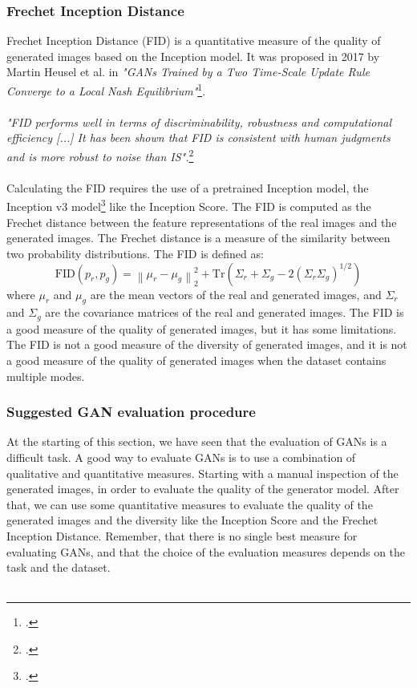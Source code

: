 \subsubsection{Frechet Inception Distance}
\label{subsubsec:frechet-inception-distance}
Frechet Inception Distance (FID) is a quantitative measure of the quality of generated images based on the Inception model.
It was proposed in 2017 by Martin Heusel et al. in \emph{"GANs Trained by a Two Time-Scale Update Rule Converge to a Local Nash Equilibrium"}\footcite{paper:heusel2017gans}.\\\\
\emph{"FID performs well in terms of discriminability, robustness and computational efficiency [...] It has been shown that FID is consistent with human judgments and is more robust to noise than IS".}\footcite{paper:ganeval}\\\\
Calculating the FID requires the use of a pretrained Inception model, the Inception v3 model\footcite{paper:inceptionv3} like the Inception Score.
The FID is computed as the Frechet distance between the feature representations of the real images and the generated images.
The Frechet distance is a measure of the similarity between two probability distributions.
The FID is defined as:
\begin{equation}
    \label{eq:frechet-inception-distance}
    \text{FID}(p_{r}, p_{g}) = \left\| \mu_{r} - \mu_{g} \right\|_{2}^{2} + \text{Tr} \left( \Sigma_{r} + \Sigma_{g} - 2 \left( \Sigma_{r} \Sigma_{g} \right)^{1/2} \right)
\end{equation}
where $\mu_{r}$ and $\mu_{g}$ are the mean vectors of the real and generated images, and $\Sigma_{r}$ and $\Sigma_{g}$ are the covariance matrices of the real and generated images.
The FID is a good measure of the quality of generated images, but it has some limitations.
The FID is not a good measure of the diversity of generated images, and it is not a good measure of the quality of generated images when the dataset contains multiple modes.
\subsubsection{Suggested GAN evaluation procedure}
\label{subsubsec:suggested-gan-evaluation-procedure}
At the starting of this section, we have seen that the evaluation of GANs is a difficult task.
A good way to evaluate GANs is to use a combination of qualitative and quantitative measures.
Starting with a manual inspection of the generated images, in order to evaluate the quality of the generator model.
After that, we can use some quantitative measures to evaluate the quality of the generated images and the diversity like the Inception Score and the Frechet Inception Distance.
Remember, that there is no single best measure for evaluating GANs, and that the choice of the evaluation measures depends on the task and the dataset.\\\\

